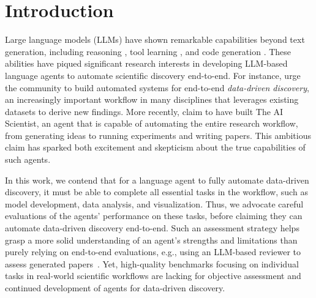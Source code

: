 \documentclass{article} %
\begin{document}


\section{Introduction}
\label{sec:intro}

%
Large language models (LLMs) have shown remarkable capabilities beyond text generation, including reasoning \citep{wei2022cot, yao2023react}, tool learning \citep{schick2023toolformer, wang-etal-2024-llms-imaginarium}, and code generation \citep{chen2021evaluatinglargelanguagemodels, yang2024sweagent}.
These abilities have piqued significant research interests in developing LLM-based language agents to automate scientific discovery end-to-end.
For instance, \citet{majumder2024position} urge the community to build automated systems for end-to-end \textit{data-driven discovery}, an increasingly important workflow in many disciplines \citep{hey2009fourthparadigm} that leverages existing datasets to derive new findings.
More recently, \citet{lu2024aiscientistfullyautomated} claim to have built The AI Scientist, an agent that is capable of automating the entire research workflow, from generating ideas to running experiments and writing papers. 
This ambitious claim has sparked both excitement and skepticism about the true capabilities of such agents.
%

%
In this work, we contend that for a language agent to fully automate data-driven discovery, it must be able to complete all essential tasks in the workflow, such as model development, data analysis, and visualization. 
Thus, we advocate careful evaluations of the agents' performance on these tasks, before claiming they can automate data-driven discovery end-to-end.
Such an assessment strategy helps grasp a more solid understanding of an agent's strengths and limitations than purely relying on end-to-end evaluations, e.g., using an LLM-based reviewer to assess generated papers~\citep{lu2024aiscientistfullyautomated}. 
Yet, high-quality benchmarks focusing on individual tasks in real-world scientific workflows are lacking for objective assessment and continued development of agents for data-driven discovery.
%
\end{document}
